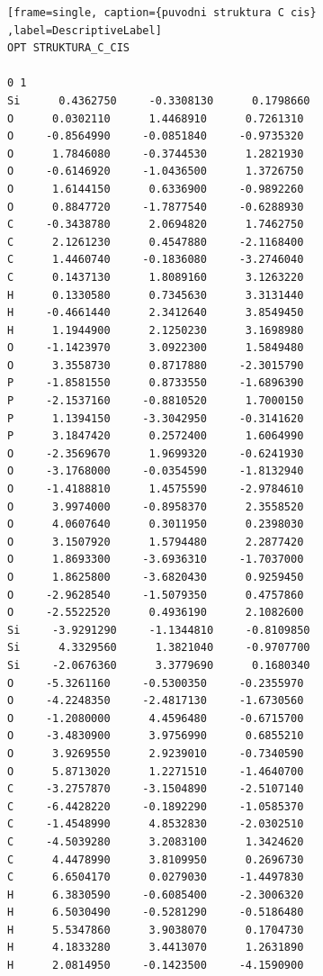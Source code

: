 \documentclass[
  digital, %
  table,   %
  lof,     %
  lot,     %
  oneside,
]{fithesis3}
\begin{document}
\newpage

  \begin{lstlisting}[frame=single, caption={puvodni struktura C cis} ,label=DescriptiveLabel]
OPT STRUKTURA_C_CIS

0 1
Si      0.4362750     -0.3308130      0.1798660
O      0.0302110      1.4468910      0.7261310
O     -0.8564990     -0.0851840     -0.9735320
O      1.7846080     -0.3744530      1.2821930
O     -0.6146920     -1.0436500      1.3726750
O      1.6144150      0.6336900     -0.9892260
O      0.8847720     -1.7877540     -0.6288930
C     -0.3438780      2.0694820      1.7462750
C      2.1261230      0.4547880     -2.1168400
C      1.4460740     -0.1836080     -3.2746040
C      0.1437130      1.8089160      3.1263220
H      0.1330580      0.7345630      3.3131440
H     -0.4661440      2.3412640      3.8549450
H      1.1944900      2.1250230      3.1698980
O     -1.1423970      3.0922300      1.5849480
O      3.3558730      0.8717880     -2.3015790
P     -1.8581550      0.8733550     -1.6896390
P     -2.1537160     -0.8810520      1.7000150
P      1.1394150     -3.3042950     -0.3141620
P      3.1847420      0.2572400      1.6064990
O     -2.3569670      1.9699320     -0.6241930
O     -3.1768000     -0.0354590     -1.8132940
O     -1.4188810      1.4575590     -2.9784610
O      3.9974000     -0.8958370      2.3558520
O      4.0607640      0.3011950      0.2398030
O      3.1507920      1.5794480      2.2877420
O      1.8693300     -3.6936310     -1.7037000
O      1.8625800     -3.6820430      0.9259450
O     -2.9628540     -1.5079350      0.4757860
O     -2.5522520      0.4936190      2.1082600
Si     -3.9291290     -1.1344810     -0.8109850
Si      4.3329560      1.3821040     -0.9707700
Si     -2.0676360      3.3779690      0.1680340
O     -5.3261160     -0.5300350     -0.2355970
O     -4.2248350     -2.4817130     -1.6730560
O     -1.2080000      4.4596480     -0.6715700
O     -3.4830900      3.9756990      0.6855210
O      3.9269550      2.9239010     -0.7340590
O      5.8713020      1.2271510     -1.4640700
C     -3.2757870     -3.1504890     -2.5107140
C     -6.4428220     -0.1892290     -1.0585370
C     -1.4548990      4.8532830     -2.0302510
C     -4.5039280      3.2083100      1.3424620
C      4.4478990      3.8109950      0.2696730
C      6.6504170      0.0279030     -1.4497830
H      6.3830590     -0.6085400     -2.3006320
H      6.5030490     -0.5281290     -0.5186480
H      5.5347860      3.9038070      0.1704730
H      4.1833280      3.4413070      1.2631890
H      2.0814950     -0.1423500     -4.1590900

\end{lstlisting}
\end{document}
